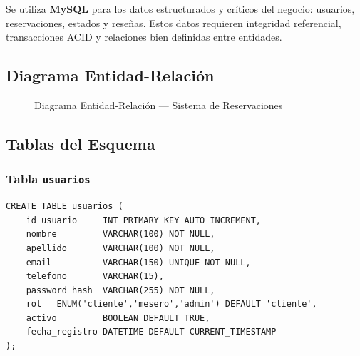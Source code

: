 \documentclass[12pt,a4paper]{article}
\begin{document}
Se utiliza \textbf{MySQL} para los datos estructurados y críticos del negocio: usuarios,
reservaciones, estados y reseñas. Estos datos requieren integridad referencial,
transacciones ACID y relaciones bien definidas entre entidades.

\subsection{Diagrama Entidad-Relación}

\begin{figure}[H]
\centering
{}
\caption{Diagrama Entidad-Relación --- Sistema de Reservaciones}
\end{figure}

\subsection{Tablas del Esquema}

\subsubsection{Tabla \texttt{usuarios}}
\begin{lstlisting}[caption={SQL --- Tabla usuarios}]
CREATE TABLE usuarios (
    id_usuario     INT PRIMARY KEY AUTO_INCREMENT,
    nombre         VARCHAR(100) NOT NULL,
    apellido       VARCHAR(100) NOT NULL,
    email          VARCHAR(150) UNIQUE NOT NULL,
    telefono       VARCHAR(15),
    password_hash  VARCHAR(255) NOT NULL,
    rol   ENUM('cliente','mesero','admin') DEFAULT 'cliente',
    activo         BOOLEAN DEFAULT TRUE,
    fecha_registro DATETIME DEFAULT CURRENT_TIMESTAMP
);
\end{lstlisting}
\end{document}
